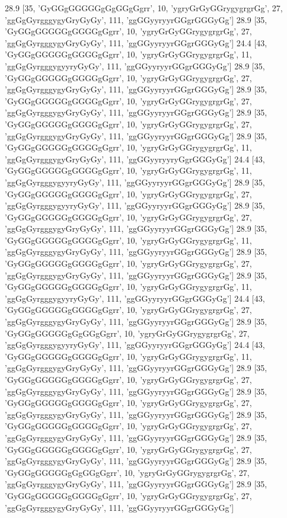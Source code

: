 28.9 [35, 'GyGGgGGGGGgGgGGgGgrr', 10, 'ygryGrGyGGrygygrgrGg', 27, 'ggGgGyrgggygyGryGyGy', 111, 'ggGGyyryyrGGgrGGGyGg']
28.9 [35, 'GyGGgGGGGGgGGGGgGgrr', 10, 'ygryGrGyGGrygygrgrGg', 27, 'ggGgGyrgggygyGryGyGy', 111, 'ggGGyyryyrGGgrGGGyGg']
24.4 [43, 'GyGGgGGGGGgGGGGgGgrr', 10, 'ygryGrGyGGrygygrgrGg', 11, 'ggGgGyrgggygyyryGyGy', 111, 'ggGGyyryyrGGgrGGGyGg']
28.9 [35, 'GyGGgGGGGGgGGGGgGgrr', 10, 'ygryGrGyGGrygygrgrGg', 27, 'ggGgGyrgggygyGryGyGy', 111, 'ggGGyyryyrGGgrGGGyGg']
28.9 [35, 'GyGGgGGGGGgGGGGgGgrr', 10, 'ygryGrGyGGrygygrgrGg', 27, 'ggGgGyrgggygyGryGyGy', 111, 'ggGGyyryyrGGgrGGGyGg']
28.9 [35, 'GyGGgGGGGGgGGGGgGgrr', 10, 'ygryGrGyGGrygygrgrGg', 27, 'ggGgGyrgggygyGryGyGy', 111, 'ggGGyyryyrGGgrGGGyGg']
28.9 [35, 'GyGGgGGGGGgGGGGgGgrr', 10, 'ygryGrGyGGrygygrgrGg', 11, 'ggGgGyrgggygyGryGyGy', 111, 'ggGGyyryyryGgrGGGyGg']
24.4 [43, 'GyGGgGGGGGgGGGGgGgrr', 10, 'ygryGrGyGGrygygrgrGg', 11, 'ggGgGyrgggygyyryGyGy', 111, 'ggGGyyryyrGGgrGGGyGg']
28.9 [35, 'GyGGgGGGGGgGGGGgGgrr', 10, 'ygryGrGyGGrygygrgrGg', 27, 'ggGgGyrgggygyyryGyGy', 111, 'ggGGyyryyrGGgrGGGyGg']
28.9 [35, 'GyGGgGGGGGgGGGGgGgrr', 10, 'ygryGrGyGGrygygrgrGg', 27, 'ggGgGyrgggygyGryGyGy', 111, 'ggGGyyryyrGGgrGGGyGg']
28.9 [35, 'GyGGgGGGGGgGGGGgGgrr', 10, 'ygryGrGyGGrygygrgrGg', 11, 'ggGgGyrgggygyGryGyGy', 111, 'ggGGyyryyrGGgrGGGyGg']
28.9 [35, 'GyGGgGGGGGgGGGGgGgrr', 10, 'ygryGrGyGGrygygrgrGg', 27, 'ggGgGyrgggygyGryGyGy', 111, 'ggGGyyryyrGGgrGGGyGg']
28.9 [35, 'GyGGgGGGGGgGGGGgGgrr', 10, 'ygryGrGyGGrygygrgrGg', 11, 'ggGgGyrgggygyyryGyGy', 111, 'ggGGyyryyrGGgrGGGyGg']
24.4 [43, 'GyGGgGGGGGgGGGGgGgrr', 10, 'ygryGrGyGGrygygrgrGg', 27, 'ggGgGyrgggygyGryGyGy', 111, 'ggGGyyryyrGGgrGGGyGg']
28.9 [35, 'GyGGgGGGGGgGgGGgGgrr', 10, 'ygryGrGyGGrygygrgrGg', 27, 'ggGgGyrgggygyyryGyGy', 111, 'ggGGyyryyrGGgrGGGyGg']
24.4 [43, 'GyGGgGGGGGgGGGGgGgrr', 10, 'ygryGrGyGGrygygrgrGg', 11, 'ggGgGyrgggygyGryGyGy', 111, 'ggGGyyryyrGGgrGGGyGg']
28.9 [35, 'GyGGgGGGGGgGGGGgGgrr', 10, 'ygryGrGyGGrygygrgrGg', 27, 'ggGgGyrgggygyGryGyGy', 111, 'ggGGyyryyrGGgrGGGyGg']
28.9 [35, 'GyGGgGGGGGgGGGGgGgrr', 10, 'ygryGrGyGGrygygrgrGg', 27, 'ggGgGyrgggygyGryGyGy', 111, 'ggGGyyryyrGGgrGGGyGg']
28.9 [35, 'GyGGgGGGGGgGGGGgGgrr', 10, 'ygryGrGyGGrygygrgrGg', 27, 'ggGgGyrgggygyGryGyGy', 111, 'ggGGyyryyrGGgrGGGyGg']
28.9 [35, 'GyGGgGGGGGgGGGGgGgrr', 10, 'ygryGrGyGGrygygrgrGg', 27, 'ggGgGyrgggygyGryGyGy', 111, 'ggGGyyryyrGGgrGGGyGg']
28.9 [35, 'GyGGgGGGGGgGgGGgGgrr', 10, 'ygryGrGyGGrygygrgrGg', 27, 'ggGgGyrgggygyGryGyGy', 111, 'ggGGyyryyrGGgrGGGyGg']
28.9 [35, 'GyGGgGGGGGgGGGGgGgrr', 10, 'ygryGrGyGGrygygrgrGg', 27, 'ggGgGyrgggygyGryGyGy', 111, 'ggGGyyryyrGGgrGGGyGg']
